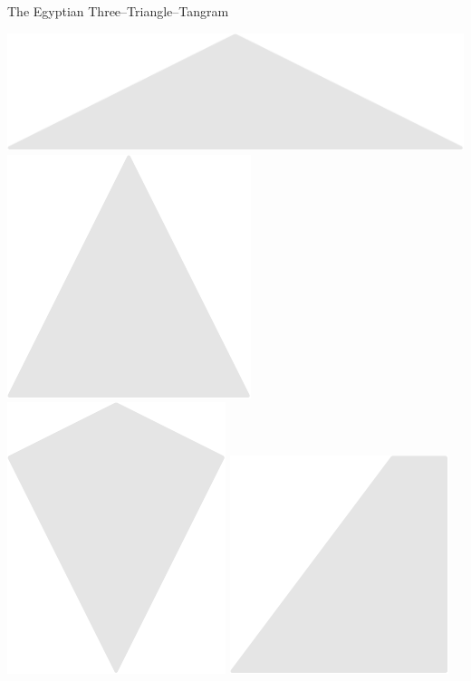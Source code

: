 \documentclass[14pt]{beamer}
\begin{document}
\begin{frame}{The Egyptian Three--Triangle--Tangram}
\begin{center}
            \bigskip\medskip

            \includegraphics[scale=0.39]{figures/figure004d.pdf}\quad
            \includegraphics[scale=0.39]{figures/figure004c.pdf}
            \includegraphics[scale=0.39]{figures/figure004j.pdf}\!\!
            \includegraphics[scale=0.39]{figures/figure004g.pdf}\quad

\end{center}
\end{frame}
\end{document}
